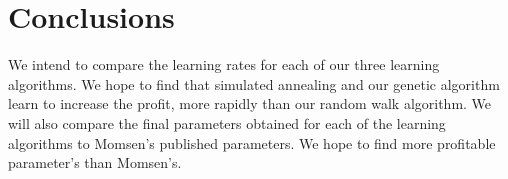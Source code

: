 \documentclass[12pt]{article}
\begin{document}
\section{Conclusions}

We intend to compare the learning rates for each of our three learning
algorithms. We hope to find that simulated annealing and our genetic algorithm
learn to increase the profit, more rapidly than our random walk algorithm. We
will also compare the final parameters obtained for each of the learning
algorithms to Momsen's published parameters. We hope to find more profitable
parameter's than Momsen's.


%
%
\end{document}
